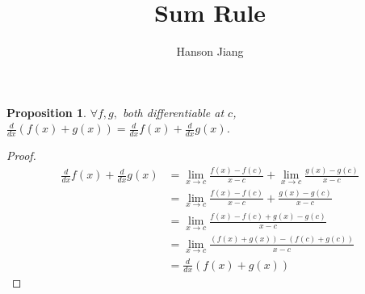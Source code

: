 \documentclass[12pt]{article}
\newtheorem{proposition}{Proposition}
\newcommand{\ddx}{\frac{d}{dx}}
\begin{document}
\title{Sum Rule}
\author{Hanson Jiang}
\maketitle

\begin{proposition}
  $\forall f, g,$ both differentiable at $c$,
  $\ddx (f(x)+g(x)) = \ddx f(x) + \ddx g(x)$.

\end{proposition}

\begin{proof}
  \begin{align*}
    \ddx f(x) + \ddx g(x)
    &=\lim_{x\rightarrow c} \frac{f(x)-f(c)}{x-c}
    +\lim_{x\rightarrow c} \frac{g(x)-g(c)}{x-c} \\
    &= \lim_{x\rightarrow c} \frac{f(x)-f(c)}{x-c} + \frac{g(x)-g(c)}{x-c} \\
    &= \lim_{x\rightarrow c} \frac{f(x)-f(c) + g(x)-g (c)}{x-c} \\
    &= \lim_{x\rightarrow c} \frac{(f(x)+g(x)) - (f(c)+g (c))}{x-c} \\
    &= \ddx (f(x)+g(x))
  \end{align*}
\end{proof}
\end{document}
